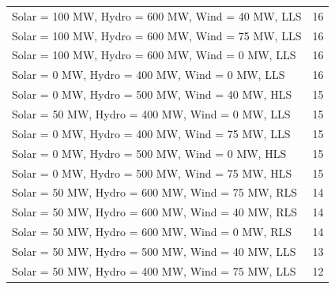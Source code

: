 \documentclass[10pt]{report}
\begin{document}
\begin{table}[H]
{\begin{tabular}{lr}
Solar = 100 MW, Hydro = 600 MW, Wind = 40 MW, LLS & 16 \\
Solar = 100 MW, Hydro = 600 MW, Wind = 75 MW, LLS & 16 \\
Solar = 100 MW, Hydro = 600 MW, Wind = 0 MW, LLS & 16 \\
Solar = 0 MW, Hydro = 400 MW, Wind = 0 MW, LLS & 16 \\
Solar = 0 MW, Hydro = 500 MW, Wind = 40 MW, HLS & 15 \\
Solar = 50 MW, Hydro = 400 MW, Wind = 0 MW, LLS & 15 \\
Solar = 0 MW, Hydro = 400 MW, Wind = 75 MW, LLS & 15 \\
Solar = 0 MW, Hydro = 500 MW, Wind = 0 MW, HLS & 15 \\
Solar = 0 MW, Hydro = 500 MW, Wind = 75 MW, HLS & 15 \\
Solar = 50 MW, Hydro = 600 MW, Wind = 75 MW, RLS & 14 \\
Solar = 50 MW, Hydro = 600 MW, Wind = 40 MW, RLS & 14 \\
Solar = 50 MW, Hydro = 600 MW, Wind = 0 MW, RLS & 14 \\
Solar = 50 MW, Hydro = 500 MW, Wind = 40 MW, LLS & 13 \\
Solar = 50 MW, Hydro = 400 MW, Wind = 75 MW, LLS & 12 \\
\bottomrule
\end{tabular}}
\end{table}
\end{document}

